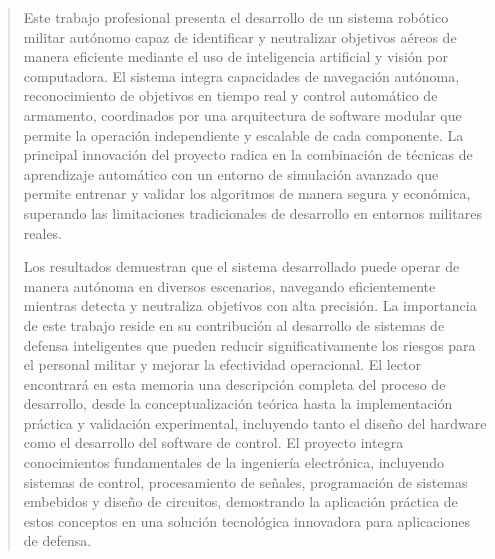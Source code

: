 \documentclass[
    11pt,
    spanish,
    singlespacing,
    parskip,
    headsepline,
    bookmarks=true,
    unicode=true,
    pdftoolbar=true,
    pdfmenubar=true,
    pdffitwindow=false,
    colorlinks=true,
    linkcolor=blue,
    citecolor=blue,
    urlcolor=blue
]{MastersDoctoralThesis}
\begin{document}



\frontmatter %
\pagestyle{plain} %


\begin{abstract}
\addchaptertocentry{\abstractname} %
Este trabajo profesional presenta el desarrollo de un sistema robótico militar autónomo capaz de identificar y neutralizar objetivos aéreos de manera eficiente mediante el uso de inteligencia artificial y visión por computadora. El sistema integra capacidades de navegación autónoma, reconocimiento de objetivos en tiempo real y control automático de armamento, coordinados por una arquitectura de software modular que permite la operación independiente y escalable de cada componente. La principal innovación del proyecto radica en la combinación de técnicas de aprendizaje automático con un entorno de simulación avanzado que permite entrenar y validar los algoritmos de manera segura y económica, superando las limitaciones tradicionales de desarrollo en entornos militares reales.

Los resultados demuestran que el sistema desarrollado puede operar de manera autónoma en diversos escenarios, navegando eficientemente mientras detecta y neutraliza objetivos con alta precisión. La importancia de este trabajo reside en su contribución al desarrollo de sistemas de defensa inteligentes que pueden reducir significativamente los riesgos para el personal militar y mejorar la efectividad operacional. El lector encontrará en esta memoria una descripción completa del proceso de desarrollo, desde la conceptualización teórica hasta la implementación práctica y validación experimental, incluyendo tanto el diseño del hardware como el desarrollo del software de control. El proyecto integra conocimientos fundamentales de la ingeniería electrónica, incluyendo sistemas de control, procesamiento de señales, programación de sistemas embebidos y diseño de circuitos, demostrando la aplicación práctica de estos conceptos en una solución tecnológica innovadora para aplicaciones de defensa.




\end{abstract}
\end{document}
